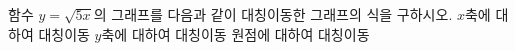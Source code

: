 \hspace*{2mm}\begin{minipage}[t]{\dimexpr\linewidth-2mm\relax}\vspace{0pt}
함수 $y=\sqrt{5x}$의 그래프를 다음과 같이 대칭이동한 그래프의 식을 구하시오.
 $x$축에 대하여 대칭이동
 $y$축에 대하여 대칭이동
 원점에 대하여 대칭이동\end{minipage}
